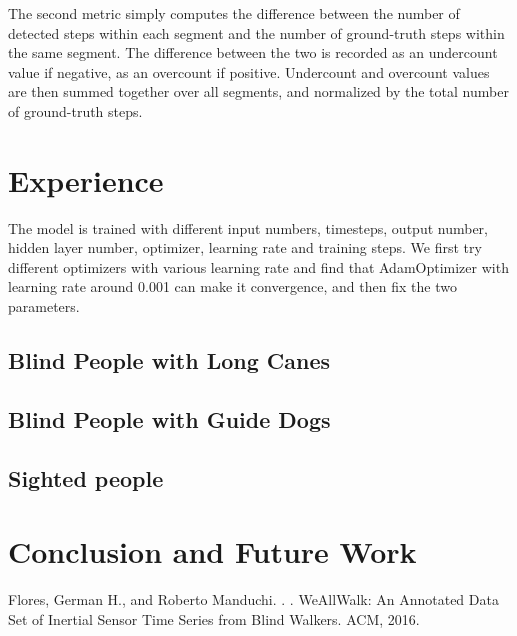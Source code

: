 \documentclass[11pt]{article}
\begin{document}
The second metric simply computes the difference between the number of detected steps within each segment and the number of ground-truth steps within the same segment. The difference between the two is recorded as an undercount value if negative, as an overcount if positive. Undercount and overcount values are then summed together over all segments, and normalized by the total number of ground-truth steps.


\section{Experience}
The model is trained with different input numbers, timesteps, output number, hidden layer number, optimizer, learning rate and training steps. We first try different optimizers with various learning rate and find that AdamOptimizer with learning rate around 0.001 can make it convergence, and then fix the two parameters.

\subsection{Blind People with Long Canes}
\subsection{Blind People with Guide Dogs}
\subsection{Sighted people}


\section{Conclusion and Future Work}






%
%

\begin{thebibliography}{}

Flores, German H., and Roberto Manduchi.
.
.
\newblock WeAllWalk: An Annotated Data Set of Inertial Sensor Time Series from Blind Walkers. ACM, 2016.






\end{thebibliography}
\end{document}
